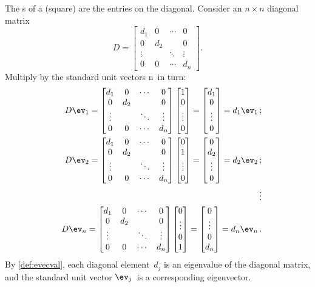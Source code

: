 \begin{example} \label{eg:eigndiag}
The s of a (square)  are the entries on the diagonal.
Consider an \(n\times n\) diagonal matrix
\def\dd{\begin{bmatrix} d_1&0&\cdots&0
\\0&d_2&&0
\\\vdots&&\ddots&\vdots
\\0&0&\cdots&d_n \end{bmatrix}}
\begin{equation*}
D=\dd.
\end{equation*}
Multiply by the standard unit vectors \hlist\ev n\ in turn:
\begin{eqnarray*}
&&D\ev_1
=\dd
\begin{bmatrix} 1\\0\\\vdots\\0 \end{bmatrix}
=\begin{bmatrix} d_1\\0\\\vdots\\0 \end{bmatrix}
=d_1\ev_1\,;
\\&&D\ev_2
=\dd
\begin{bmatrix} 0\\1\\\vdots\\0 \end{bmatrix}
=\begin{bmatrix} 0\\d_2\\\vdots\\0 \end{bmatrix}
=d_2\ev_2\,;
\\&&\vdots
\\&&D\ev_n
=\dd
\begin{bmatrix} 0\\\vdots\\0\\1 \end{bmatrix}
=\begin{bmatrix} 0\\\vdots\\0\\d_n \end{bmatrix}
=d_n\ev_n\,.
\end{eqnarray*}
By \autoref{def:evecval}, each diagonal element~\(d_j\)  is an eigenvalue of the diagonal matrix, and the standard unit vector \(\ev_j\)~is a corresponding eigenvector.
\end{example}

